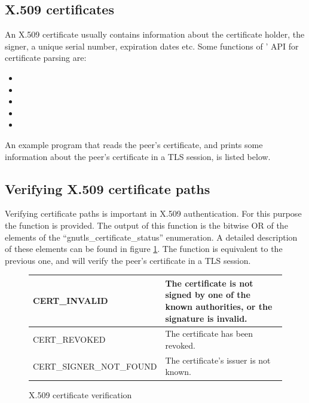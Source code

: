 \subsection*{X.509 certificates}
An X.509 certificate usually contains information about the certificate
holder, the signer, a unique serial number, expiration dates etc. Some
functions of \gnutls{}' API for certificate parsing are:
\begin{itemize}
\item {}
\item {}
\item {}
\item {}
\item {}
\end{itemize}

\par
An example program that reads the peer's certificate,
and prints some information about the peer's certificate in a TLS session,
is listed below.




\subsection*{Verifying X.509 certificate paths}
Verifying certificate paths is important 
in X.509 authentication. For this purpose the function
 is provided. The
output of this function is the bitwise OR of the elements of the
``gnutls\_certificate\_status'' enumeration. A detailed description of
these elements can be found in figure \ref{fig:verify}.
The function 
is equivalent to the previous one, and will verify the peer's certificate in a TLS session.

\begin{figure}[hbtp]
\begin{tabular}{|l|p{9cm}|}

\hline
CERT\_INVALID & The certificate is not signed by one of the known authorities, or
the signature is invalid.
\\
\hline
CERT\_REVOKED & The certificate has been revoked.
\\
\hline
CERT\_SIGNER\_NOT\_FOUND & The certificate's issuer is not known.
\\
\hline
\end{tabular}
\caption{X.509 certificate verification}
\label{fig:verify}
\end{figure}

